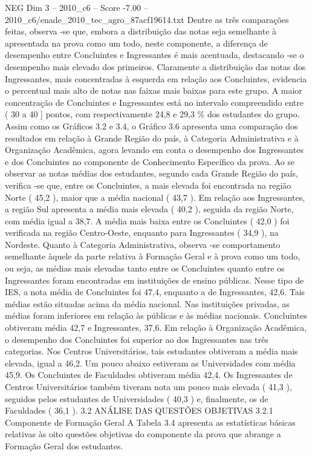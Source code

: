 \begin{textsample}{NEG Dim 3 – 2010\_c6 – Score -7.00 – 2010\_c6/enade\_2010\_tec\_agro\_87acf19614.txt}
Dentre as três comparações feitas, observa -se que, embora a distribuição das notas seja semelhante à apresentada na prova como um todo, neste componente, a diferença de desempenho entre Concluintes e Ingressantes é mais acentuada, destacando -se o desempenho mais elevado dos primeiros.
Claramente a distribuição das notas dos Ingressantes, mais concentradas à esquerda em relação aos Concluintes, evidencia o percentual mais alto de notas nas faixas mais baixas para este grupo.
A maior concentração de Concluintes e Ingressantes está no intervalo compreendido entre ( 30 a 40 ] pontos, com respectivamente 24,8 e 29,3 \% dos estudantes do grupo.
Assim como os Gráficos 3.2 e 3.4, o Gráfico 3.6 apresenta uma comparação dos resultados em relação à Grande Região do país, à Categoria Administrativa e à Organização Acadêmica, agora levando em conta o desempenho dos Ingressantes e dos Concluintes no componente de Conhecimento Específico da prova.
Ao se observar as notas médias dos estudantes, segundo cada Grande Região do país, verifica -se que, entre os Concluintes, a mais elevada foi encontrada na região Norte ( 45,2 ), maior que a média nacional ( 43,7 ).
Em relação aos Ingressantes, a região Sul apresenta a média mais elevada ( 40,2 ), seguida da região Norte, com média igual a 38,7.
A média mais baixa entre os Concluintes ( 42,0 ) foi verificada na região Centro-Oeste, enquanto para Ingressantes ( 34,9 ), na Nordeste.
Quanto à Categoria Administrativa, observa -se comportamento semelhante àquele da parte relativa à Formação Geral e à prova como um todo, ou seja, as médias mais elevadas tanto entre os Concluintes quanto entre os Ingressantes foram encontradas em instituições de ensino públicas.
Nesse tipo de IES, a nota média de Concluintes foi 47,4, enquanto a de Ingressantes, 42,6.
Tais médias estão situadas acima da média nacional.
Nas instituições privadas, as médias foram inferiores em relação às públicas e às médias nacionais.
Concluintes obtiveram média 42,7 e Ingressantes, 37,6.
Em relação à Organização Acadêmica, o desempenho dos Concluintes foi superior ao dos Ingressantes nas três categorias.
Nos Centros Universitários, tais estudantes obtiveram a média mais elevada, igual a 46,2.
Um pouco abaixo estiveram as Universidades com média 45,9.
Os Concluintes de Faculdades obtiveram média 42,4.
Os Ingressantes de Centros Universitários também tiveram nota um pouco mais elevada ( 41,3 ), seguidos pelos estudantes de Universidades ( 40,3 ) e, finalmente, os de Faculdades ( 36,1 ). 3.2 ANÁLISE DAS QUESTÕES OBJETIVAS 3.2.1 Componente de Formação Geral A Tabela 3.4 apresenta as estatísticas básicas relativas às oito questões objetivas do componente da prova que abrange a Formação Geral dos estudantes.

\end{textsample}
